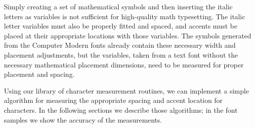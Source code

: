 
Simply creating a set of mathematical symbols and then inserting the italic
letters as variables is not sufficient for high-quality math typesetting. The
italic letter variables must also be properly fitted and spaced, and accents
must be placed at their appropriate locations with those variables. The symbols
generated from the Computer Modern fonts already contain these necessary width
and placement adjustments, but the variables, taken from a text font without the
necessary mathematical placement dimensions, need to be measured for proper
placement and spacing.

Using our library of character measurement routines, we can implement a simple
algorithm for measuring the appropriate spacing and accent location for
characters. In the following sections we describe those algorithms; in the font
samples we show the accuracy of the measurements.
